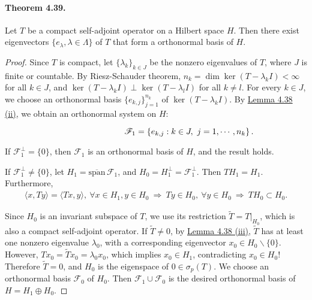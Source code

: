 \documentclass{article}
\begin{document}
\paragraph{Theorem 4.39.\label{thm:4.39}} Let $T$ be a compact self-adjoint operator on a Hilbert space $H$. Then there exist eigenvectors $\{e_\lambda,\lambda\in\Lambda\}$ of $T$ that form a orthonormal basis of $H$.
\begin{proof}
Since $T$ is compact, let $\{\lambda_k\}_{k\in J}$ be the nonzero eigenvalues of $T$, where $J$ is finite or countable. By Riesz-Schauder theorem, $n_k=\dim\ker(T-\lambda_k I)<\infty$ for all $k\in J$, and $\ker(T-\lambda_k I)\perp\ker(T-\lambda_l I)$ for all $k\neq l$. For every $k\in J$, we choose an orthonormal basis $\{e_{k,j}\}_{j=1}^{n_k}$ of $\ker(T-\lambda_k I)$. By \hyperref[lemma:4.38]{Lemma 4.38 (ii)}, we obtain an orthonormal system on $H$:\vspace{0.30cm}

$\hspace{5cm}\mathscr{F}_1 = \left\{e_{k,j}:k\in J,\ j=1,\cdots,n_k\right\}.\vspace{0.30cm}$

If $\mathscr{F}_1^\perp=\{0\}$, then $\mathscr{F}_1$ is an orthonormal basis of $H$, and the result holds.

If $\mathscr{F}_1^\perp\neq\{0\}$, let $H_1=\overline{\mathrm{span}}\,\mathscr{F}_1$, and $H_0=H_1^\perp=\mathscr{F}_1^\perp$. Then $TH_1=H_1$. Furthermore,
\begin{align*}
	\langle x,Ty\rangle = \langle Tx,y\rangle,\ \forall x\in H_1,y\in H_0\ \Rightarrow\ Ty\in H_0,\ \forall y\in H_0\ \Rightarrow\ TH_0\subset H_0.
\end{align*}

Since $H_0$ is an invariant subspace of $T$, we use its restriction $\widetilde{T}=T|_{H_0}$, which is also a compact self-adjoint operator. If $\widetilde{T}\neq 0$, by  \hyperref[lemma:4.38]{Lemma 4.38 (iii)}, $\widetilde{T}$ has at least one nonzero eigenvalue $\lambda_0$, with a corresponding eigenvector $x_0\in H_0\backslash\{0\}$. However, $Tx_0 = \widetilde{T}x_0=\lambda_0x_0$, which implies $x_0\in H_1$, contradicting $x_0\in H_0$! Therefore $\widetilde{T}=0$, and $H_0$ is the eigenspace of $0\in\sigma_p(T)$. We choose an orthonormal basis $\mathscr{F}_0$ of $H_0$. Then $\mathscr{F}_1\cup\mathscr{F}_0$ is the desired orthonormal basis of $H=H_1\oplus H_0$.
\end{proof}
\end{document}
